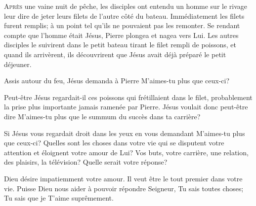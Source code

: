 





\lettrine{A}{près} une vaine nuit de pêche,
 les disciples ont entendu un homme sur le rivage
 leur dire de jeter leurs filets
 de l'autre côté du bateau. Immédiatement les filets furent remplis;
 à un point tel qu'ils ne pouvaient pas les remonter.
 Se rendant compte que l'homme était Jésus, Pierre plongea et nagea vers Lui.
 Les autres disciples le suivirent dans le petit bateau
 tirant le filet rempli de poissons, et quand ils arrivèrent,
 ils découvrirent que Jésus avait déjà préparé le petit déjeuner.

Assis autour du feu, Jésus demanda à Pierre\frcolon{} 
 \Og M'aimes-tu plus que ceux-ci? \Fg{}


Peut-être Jésus regardait-il ces poissons qui frétillaient dans le filet,
 probablement la prise plus importante jamais ramenée par Pierre.
 Jésus voulait donc peut-être dire\frcolon{} 
 \Og M'aimes-tu plus que le summum du succès dans ta carrière? \Fg{}

Si Jésus vous regardait droit dans les yeux en vous demandant\frcolon{}
 \Og M'aimes-tu plus que ceux-ci? \Fg{} 
 Quelles sont les choses dans votre vie qui se disputent votre attention
 et éloignent votre amour de Lui? Vos buts, votre carrière, une relation,
 des plaisirs, la télévision? Quelle serait votre réponse?

Dieu désire impatiemment votre amour. Il veut être le tout premier
 dans votre vie. Puisse Dieu nous aider à pouvoir répondre\frcolon{} 
 \Og Seigneur, Tu sais toutes choses; Tu sais que je T'aime suprêmement. \Fg{}

\dvrule



